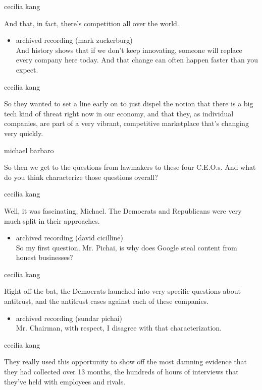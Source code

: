 cecilia kang

And that, in fact, there's competition all over the world.

\begin{itemize}
\tightlist
\item
  archived recording (mark zuckerburg)\\
  And history shows that if we don't keep innovating, someone will
  replace every company here today. And that change can often happen
  faster than you expect.
\end{itemize}

cecilia kang

So they wanted to set a line early on to just dispel the notion that
there is a big tech kind of threat right now in our economy, and that
they, as individual companies, are part of a very vibrant, competitive
marketplace that's changing very quickly.

michael barbaro

So then we get to the questions from lawmakers to these four C.E.O.s.
And what do you think characterize those questions overall?

cecilia kang

Well, it was fascinating, Michael. The Democrats and Republicans were
very much split in their approaches.

\begin{itemize}
\tightlist
\item
  archived recording (david cicilline)\\
  So my first question, Mr. Pichai, is why does Google steal content
  from honest businesses?
\end{itemize}

cecilia kang

Right off the bat, the Democrats launched into very specific questions
about antitrust, and the antitrust cases against each of these
companies.

\begin{itemize}
\tightlist
\item
  archived recording (sundar pichai)\\
  Mr. Chairman, with respect, I disagree with that characterization.
\end{itemize}

cecilia kang

They really used this opportunity to show off the most damning evidence
that they had collected over 13 months, the hundreds of hours of
interviews that they've held with employees and rivals.

